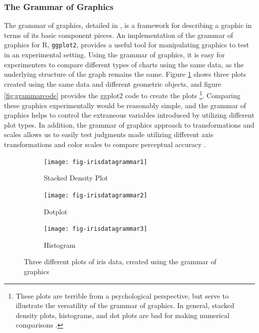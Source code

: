 \documentclass[11pt]{isuthesis}\usepackage[]{graphicx}\usepackage[]{color}
\begin{document}
\subsubsection{The Grammar of Graphics}
The grammar of graphics, detailed in \citet{wilkinson2006grammar}, is a framework for describing a graphic in terms of its basic component pieces. An implementation of the grammar of graphics for R, \texttt{ggplot2}\citep{ggplot2, wickham2010layered}, provides a useful tool for manipulating graphics to test in an experimental setting. Using the grammar of graphics, it is easy for experimenters to compare different types of charts using the same data, as the underlying structure of the graph remains the same. Figure \ref{fig:grammarplots} shows three plots created using the same data and different geometric objects, and figure \ref{fig:grammarcode} provides the ggplot2 code to create the plots \footnote{These plots are terrible from a psychological perspective, but serve to illustrate the versatility of the grammar of graphics. In general, stacked density plots, histograms, and dot plots are bad for making numerical comparisons \citep{cleveland:1985}.}. Comparing these graphics experimentally would be reasonably simple, and the grammar of graphics helps to control the extraneous variables introduced by utilizing different plot types. In addition, the grammar of graphics approach to transformations and scales allows us to easily test judgments made utilizing different axis transformations and color scales to compare perceptual accuracy \citep{hofmann2012graphical}. 



\begin{figure}[htbp]\centering
\begin{subfigure}[b]{.33\textwidth}\centering
  \texttt{[image: fig-irisdatagrammar1]}
  \caption{Stacked Density Plot}
\end{subfigure}\hfill
\begin{subfigure}[b]{.33\textwidth}\centering
  \texttt{[image: fig-irisdatagrammar2]}
  \caption{Dotplot}
\end{subfigure}\hfill
\begin{subfigure}[b]{.33\textwidth}\centering
  \texttt{[image: fig-irisdatagrammar3]}
  \caption{Histogram}
\end{subfigure}\hfill
\caption{Three different plots of iris data, created using the grammar of graphics}\label{fig:grammarplots}
\end{figure}
\end{document}
